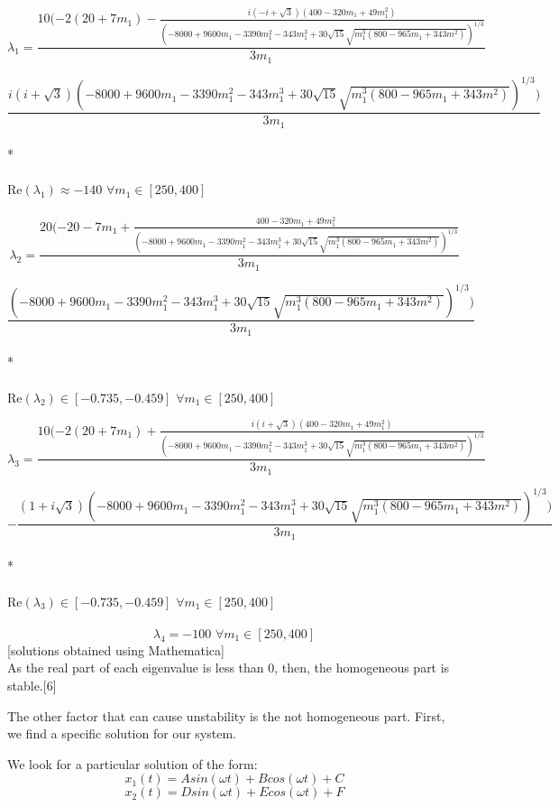 \documentclass[a4paper]{article}
\begin{document}
$$
  \lambda_1 =
  \frac{
  	10(-2(20+7m_1) -
  	\frac{
    	i(-i+\sqrt{3})(400-320m_1+49m_1^2)}
        {(-8000 + 9600 m_1 - 3390 m_1^2-343m_1^3+30\sqrt{15}\sqrt{m_1^3(800-965m_1+343m^2)})^{1/3}}}
  {3m_1}
$$

$$
  \frac{i(i+\sqrt{3})(-8000 + 9600 m_1 - 3390 m_1^2-343m_1^3+30\sqrt{15}\sqrt{m_1^3(800-965m_1+343m^2)})^{1/3})}
  {3m_1}
$$
\\*
\\
\\
Re$(\lambda_1)\approx -140\,\, \forall m_1 \in [250,400]$
\\
\\
$$
  \lambda_2 =
  \frac{
  	20(-20-7m_1 +
  	\frac{
    	400-320m_1+49m_1^2}
        {(-8000 + 9600 m_1 - 3390 m_1^2-343m_1^3+30\sqrt{15}\sqrt{m_1^3(800-965m_1+343m^2)})^{1/3}}}
  {3 m_1}
$$

$$
  \frac{
  	(-8000 + 9600 m_1 - 3390 m_1^2-343m_1^3+30\sqrt{15}\sqrt{m_1^3(800-965m_1+343m^2)})^{1/3})}
    {3m_1}
$$
\\*
\\
\\
Re$(\lambda_2)\in [-0.735,-0.459]\,\, \forall m_1 \in [250,400]$

\newpage

$$
  \lambda_3 =
  	\frac{
    	10(-2(20+7m_1) +
        \frac{
        	i(i+\sqrt{3})(400-320m_1+49m_1^2)}
            {(-8000 + 9600 m_1 - 3390 m_1^2-343m_1^3+30\sqrt{15}\sqrt{m_1^3(800-965m_1+343m^2)})^{1/3}}}
    {3m_1}
$$

$$
  -\frac{(1+i\sqrt{3})(-8000 + 9600 m_1 - 3390 m_1^2-343m_1^3+30\sqrt{15}\sqrt{m_1^3(800-965m_1+343m^2)})^{1/3})}
  {3m_1}
$$
\\*
\\
\\
Re$(\lambda_3)\in [-0.735,-0.459]\,\, \forall m_1 \in [250,400]$
\\
\\
$$
	\lambda_4=-100 \,\, \forall m_1 \in [250,400]
$$
[solutions obtained using Mathematica]\\

As the real part of each eigenvalue is less than 0,
then, the homogeneous part is stable.[6]






The other factor that can cause unstability is the not homogeneous part.
First, we find a specific solution for our system.

We look for a particular solution of the form:
$$x_1(t)=A sin(\omega t)+B cos(\omega t)+C$$
\begin{equation}
	x_2(t)=D sin(\omega t)+E cos(\omega t)+F
\end{equation}
\end{document}
